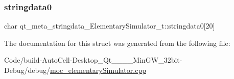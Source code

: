 \subsubsection{\texorpdfstring{stringdata0}{stringdata0}}
{\footnotesize\ttfamily char qt\+\_\+meta\+\_\+stringdata\+\_\+\+Elementary\+Simulator\+\_\+t\+::stringdata0\mbox{[}20\mbox{]}}



The documentation for this struct was generated from the following file\+:\begin{DoxyCompactItemize}
\item 
Code/build-\/\+Auto\+Cell-\/\+Desktop\+\_\+\+Qt\+\_\+\_\+\_\+\_\+\+Min\+G\+W\+\_\+32bit-\/\+Debug/debug/\mbox{\hyperlink{moc__elementary_simulator_8cpp}{moc\+\_\+elementary\+Simulator.\+cpp}}\end{DoxyCompactItemize}
